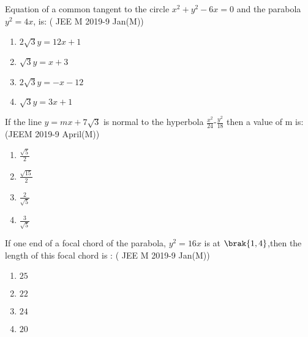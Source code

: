 \item Equation of a common tangent to the circle $x^2+y^2-6x=0$ and the parabola $y^2=4x$, is:
     \hfill{( JEE M 2019-9 Jan(M))}
	\begin{enumerate}
    		\item $2\sqrt{3}y=12x+1$ 
    		\item $\sqrt{3}y=x+3$
    		\item $2\sqrt{3}y=-x-12$ 
    		\item $\sqrt{3}y=3x+1$
	\end{enumerate}   
\item If the line $y=mx+7\sqrt{3}$ is normal to the hyperbola $\frac{x^2}{24}$-$\frac{y^2}{18}$ then a value of m is: 
     \hfill{(JEEM 2019-9 April(M))}
	\begin{enumerate}
    		\item $\frac{\sqrt{5}}{2}$ 
    		\item $\frac{\sqrt{15}}{2}$
    		\item $\frac{2}{\sqrt5}$
    		\item $\frac{3}{\sqrt5}$
	\end{enumerate}
\item If one end of a focal chord of the parabola, $y^2=16x$ is at $\brak{1,4}$,then the length of this focal chord is :
     \hfill{( JEE M 2019-9 Jan(M))}
	\begin{enumerate}
    		\item $25$
    		\item $22$
    		\item $24$
    		\item $20$
	\end{enumerate}    

